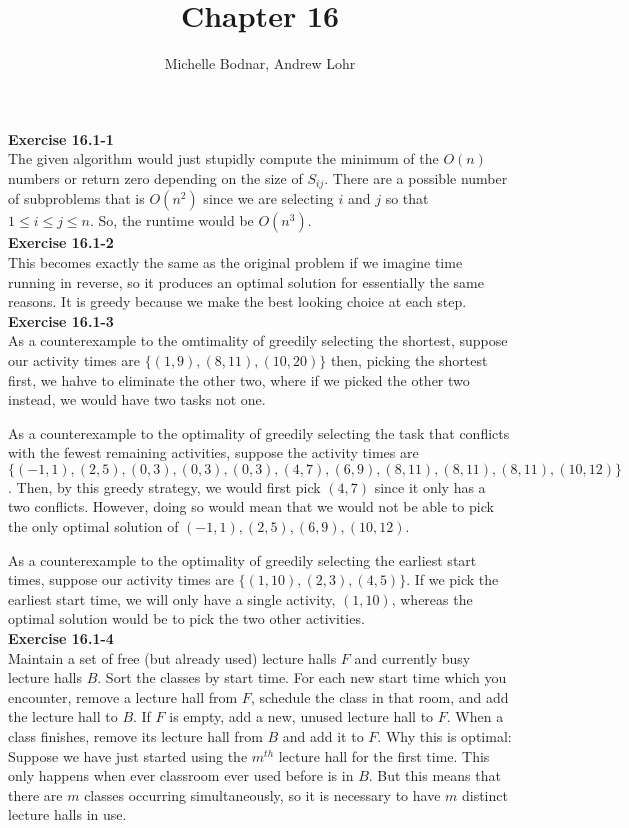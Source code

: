 \documentclass{article}
\title{Chapter 16}
\author{Michelle Bodnar, Andrew Lohr}
\begin{document}
\maketitle

\noindent\textbf{Exercise 16.1-1}\\

The given algorithm would just stupidly compute the minimum of the $O(n)$ numbers or return zero depending on the size of $S_{ij}$. There are a possible number of subproblems that is $O(n^2)$ since we are selecting $i$ and $j$ so that $1\le i \le j\le n$. So, the runtime would be $O(n^3)$. \\

\noindent\textbf{Exercise 16.1-2}\\

This becomes exactly the same as the original problem if we imagine time running in reverse, so it produces an optimal solution for essentially the same reasons.  It is greedy because we make the best looking choice at each step.\\

\noindent\textbf{Exercise 16.1-3}\\

As a counterexample to the omtimality of greedily selecting the shortest, suppose our activity times are $\{(1,9),(8,11),(10,20)\}$ then, picking the shortest first, we hahve to eliminate the other two, where if we picked the other two instead, we would have two tasks not one.

As a counterexample to the optimality of greedily selecting the task that conflicts with the fewest remaining activities, suppose the activity times are $\{(-1,1),(2,5),(0,3),(0,3),(0,3),(4,7),(6,9),(8,11),(8,11),(8,11),(10,12)\}$. Then, by this greedy strategy, we would first pick $(4,7)$ since it only has a two conflicts. However, doing so would mean that we would not be able to pick the only optimal solution of $(-1,1),(2,5),(6,9),(10,12)$.

As a counterexample to the optimality of greedily selecting the earliest start times, suppose our activity times are $\{(1,10),(2,3),(4,5)\}$. If we pick the earliest start time, we will only have a single activity, $(1,10)$, whereas the optimal solution would be to pick the two other activities.\\

\noindent\textbf{Exercise 16.1-4}\\

Maintain a set of free (but already used) lecture halls $F$ and currently busy lecture halls $B$.  Sort the classes by start time.  For each new start time which you encounter, remove a lecture hall from $F$, schedule the class in that room, and add the lecture hall to $B$. If $F$ is empty, add a new, unused lecture hall to $F$.  When a class finishes, remove its lecture hall from $B$ and add it to $F$.  Why this is optimal:  Suppose we have just started using the $m^{th}$ lecture hall for the first time.  This only happens when ever classroom ever used before is in $B$.  But this means that there are $m$ classes occurring simultaneously, so it is necessary to have $m$ distinct lecture halls in use.  \\
\end{document}
